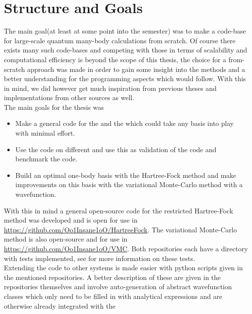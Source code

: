 \section{Structure and Goals\label{sec:structure_and_goals}}
    The main goal(at least at some point into the semester) was to make a
    code-base for large-scale quantum many-body calculations from scratch. Of
    course there exists many such code-bases and competing with those in terms
    of scalability and computational efficiency is beyond the scope of this
    thesis, the choice for a from-scratch approach was made in order to gain
    some insight into the methods and a better understanding for the
    programming aspects which would follow. With this in mind, we did however
    get much inspiration from previous theses and implementations from other
    sources as well. \\
    The main goals for the thesis was
        \begin{itemize}
            \item Make a general \CC code for the 
                and the  which could take
                any basis into play with minimal effort.
            \item Use the \CC code on different  and use this as validation of the code and
                benchmark the code.
            \item Build an optimal one-body basis with the Hartree-Fock method
                and make improvements on this basis with the variational
                Monte-Carlo method with a  wavefunction.
        \end{itemize}
    With this in mind a general open-source code for the restricted
    Hartree-Fock method was developed and is open for use in
    \url{https://github.com/Oo1Insane1oO/HartreeFock}. The variational
    Monte-Carlo method is also open-source and for use in
    \url{https://github.com/Oo1Insane1oO/VMC}. Both repositories each have a
    directory with tests implemented, see  for more
    information on these tests. \\
    Extending the code to other systems is made easier with python scripts
    given in the mentioned repositories. A better description of these are
    given in the repositories themselves and involve auto-generation of
    abstract wavefunction classes which only need to be filled in with
    analytical expressions and are otherwise already integrated with the
